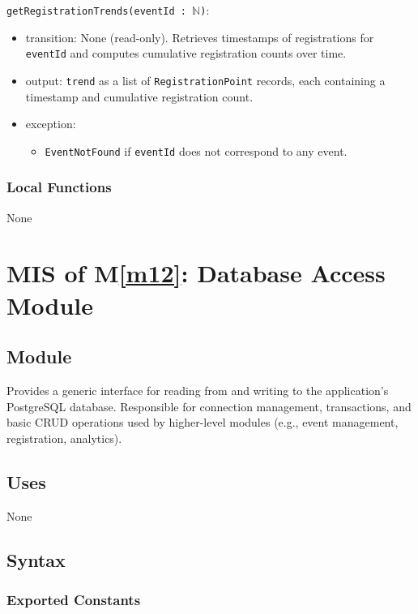 \documentclass[12pt, titlepage]{article}
\begin{document}
\noindent \texttt{getRegistrationTrends(eventId : $\mathbb{N}$)}:
\begin{itemize}
  \item transition: None (read-only). Retrieves timestamps of registrations for
        \texttt{eventId} and computes cumulative registration counts over time.
  \item output: \texttt{trend} as a list of \texttt{RegistrationPoint} records,
        each containing a timestamp and cumulative registration count.
  \item exception:
    \begin{itemize}
      \item \texttt{EventNotFound} if \texttt{eventId} does not correspond to any event.
    \end{itemize}
\end{itemize}

\subsubsection{Local Functions}

None

\newpage

\section{MIS of M\ref{m12}: Database Access Module}

\subsection{Module}

Provides a generic interface for reading from and writing to the application's
PostgreSQL database. Responsible for connection management, transactions,
and basic CRUD operations used by higher-level modules (e.g., event
management, registration, analytics).

\subsection{Uses}

None

\subsection{Syntax}

\subsubsection{Exported Constants}
\end{document}
